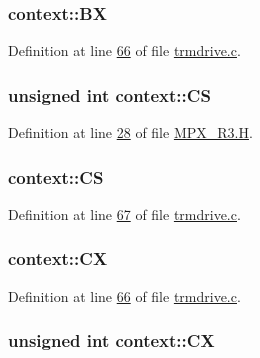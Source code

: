 \hypertarget{structcontext_a47b120f45dd09466883dd992e4013393}{
\subsubsection[{BX}]{ {\bf context::BX}}}
\label{structcontext_a47b120f45dd09466883dd992e4013393}


Definition at line \hyperlink{trmdrive_8c_source_l00066}{66} of file \hyperlink{trmdrive_8c_source}{trmdrive.c}.

\hypertarget{structcontext_a0b41903d1fa3b4e1ce892f59480323b5}{
\subsubsection[{CS}]{\setlength{\rightskip}{0pt plus 5cm}unsigned int {\bf context::CS}}}
\label{structcontext_a0b41903d1fa3b4e1ce892f59480323b5}


Definition at line \hyperlink{_m_p_x___r3_8_h_source_l00028}{28} of file \hyperlink{_m_p_x___r3_8_h_source}{MPX\_\-R3.H}.

\hypertarget{structcontext_a7386486f860ed54d86c941394b57a34b}{
\subsubsection[{CS}]{ {\bf context::CS}}}
\label{structcontext_a7386486f860ed54d86c941394b57a34b}


Definition at line \hyperlink{trmdrive_8c_source_l00067}{67} of file \hyperlink{trmdrive_8c_source}{trmdrive.c}.

\hypertarget{structcontext_ab314318f68612a50def4e9bfaca766f6}{
\subsubsection[{CX}]{ {\bf context::CX}}}
\label{structcontext_ab314318f68612a50def4e9bfaca766f6}


Definition at line \hyperlink{trmdrive_8c_source_l00066}{66} of file \hyperlink{trmdrive_8c_source}{trmdrive.c}.

\hypertarget{structcontext_a7f06dbf351fa2b704708aadf139eb1d4}{
\subsubsection[{CX}]{\setlength{\rightskip}{0pt plus 5cm}unsigned int {\bf context::CX}}}
\label{structcontext_a7f06dbf351fa2b704708aadf139eb1d4}


